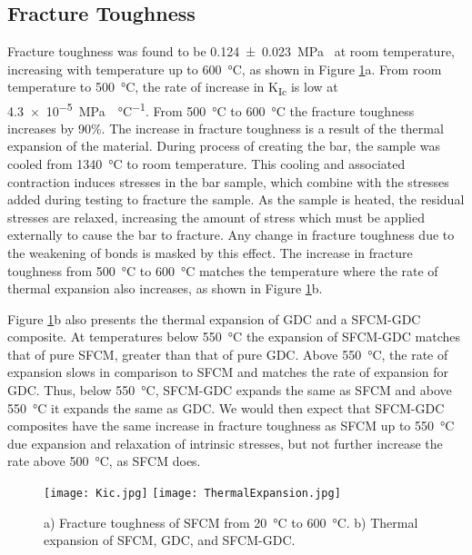     \subsection{Fracture Toughness}
        Fracture toughness was found to be \SI[separate-uncertainty = true]{0.124 +- 0.023}{\mega\pascal{}} at room temperature, increasing with temperature up to \SI{600}{\celsius}, as shown in Figure \ref{fig:Kic}a.
        From room temperature to \SI{500}{\celsius}, the rate of increase in K\textsubscript{Ic} is low at \SI{4.3e-5}{\mega\pascal{}\per\celsius}.
        From \SI{500}{\celsius} to \SI{600}{\celsius} the fracture toughness increases by 90\%.
        The increase in fracture toughness is a result of the thermal expansion of the material.
        During process of creating the bar, the sample was cooled from \SI{1340}{\celsius} to room temperature.
        This cooling and associated contraction induces stresses in the bar sample, which combine with the stresses added during testing to fracture the sample.
        As the sample is heated, the residual stresses are relaxed, increasing the amount of stress which must be applied externally to cause the bar to fracture.
        Any change in fracture toughness due to the weakening of bonds is masked by this effect.
        The increase in fracture toughness from \SI{500}{\celsius} to \SI{600}{\celsius} matches the temperature where the rate of thermal expansion also increases, as shown in Figure \ref{fig:Kic}b.

        Figure \ref{fig:Kic}b also presents the thermal expansion of GDC and a SFCM-GDC composite.
        At temperatures below \SI{550}{\celsius} the expansion of SFCM-GDC matches that of pure SFCM, greater than that of pure GDC.
        Above \SI{550}{\celsius}, the rate of expansion slows in comparison to SFCM and matches the rate of expansion for GDC.
        Thus, below \SI{550}{\celsius}, SFCM-GDC expands the same as SFCM and above \SI{550}{\celsius} it expands the same as GDC.
        We would then expect that SFCM-GDC composites have the same increase in fracture toughness as SFCM up to \SI{550}{\celsius} due expansion and relaxation of intrinsic stresses, but not further increase the rate above \SI{500}{\celsius}, as SFCM does.

        \begin{figure}
          \texttt{[image: Kic.jpg]}
          \texttt{[image: ThermalExpansion.jpg]}
          \caption{a) Fracture toughness of SFCM from \SI{20}{\celsius} to \SI{600}{\celsius}. b) Thermal expansion of SFCM, GDC, and SFCM-GDC.}
          \label{fig:Kic}
        \end{figure}

